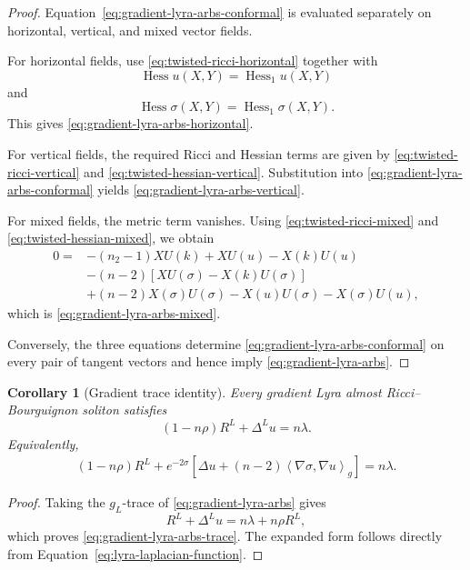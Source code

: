 \documentclass[a4paper,11pt]{article}
\theoremstyle{plain}
\newtheorem{corollary} {Corollary}[section]
\numberwithin{equation}{section}
\begin{document}
\begin{proof}
	Equation~\eqref{eq:gradient-lyra-arbs-conformal} is evaluated
	separately on horizontal, vertical, and mixed vector fields.
	
	For horizontal fields, use
	\eqref{eq:twisted-ricci-horizontal} together with
	\[
	\operatorname{Hess}u(X,Y)
	=
	\operatorname{Hess}_{1}u(X,Y)
	\]
	and
	\[
	\operatorname{Hess}\sigma(X,Y)
	=
	\operatorname{Hess}_{1}\sigma(X,Y).
	\]
	This gives \eqref{eq:gradient-lyra-arbs-horizontal}.
	
	For vertical fields, the required Ricci and Hessian terms are
	given by
	\eqref{eq:twisted-ricci-vertical} and
	\eqref{eq:twisted-hessian-vertical}. Substitution into
	\eqref{eq:gradient-lyra-arbs-conformal} yields
	\eqref{eq:gradient-lyra-arbs-vertical}.
	
	For mixed fields, the metric term vanishes. Using
	\eqref{eq:twisted-ricci-mixed} and
	\eqref{eq:twisted-hessian-mixed}, we obtain
	\begin{align*}
		0
		={}&
		-
		(n_{2}-1)XU(k)
		+
		XU(u)-X(k)U(u)
		\\
		&-
		(n-2)
		\left[
		XU(\sigma)-X(k)U(\sigma)
		\right]
		\\
		&+
		(n-2)X(\sigma)U(\sigma)
		-
		X(u)U(\sigma)
		-
		X(\sigma)U(u),
	\end{align*}
	which is \eqref{eq:gradient-lyra-arbs-mixed}.
	
	Conversely, the three equations determine
	\eqref{eq:gradient-lyra-arbs-conformal} on every pair of tangent
	vectors and hence imply
	\eqref{eq:gradient-lyra-arbs}.
\end{proof}

\begin{corollary}[Gradient trace identity]
	\label{cor:gradient-lyra-arbs-trace}
	Every gradient Lyra almost Ricci--Bourguignon soliton satisfies
	\begin{equation}
		(1-n\rho)R^{L}
		+
		\Delta^{L}u
		=
		n\lambda.
		\label{eq:gradient-lyra-arbs-trace}
	\end{equation}
	Equivalently,
	\begin{align}
		(1-n\rho)R^{L}
		+
		e^{-2\sigma}
		\left[
		\Delta u
		+
		(n-2)
		\left\langle
		\nabla\sigma,\nabla u
		\right\rangle_{g}
		\right]
		=
		n\lambda.
		\label{eq:gradient-lyra-arbs-trace-expanded}
	\end{align}
\end{corollary}

\begin{proof}
	Taking the \(g_{L}\)-trace of
	\eqref{eq:gradient-lyra-arbs} gives
	\[
	R^{L}
	+
	\Delta^{L}u
	=
	n\lambda+n\rho R^{L},
	\]
	which proves \eqref{eq:gradient-lyra-arbs-trace}. The expanded
	form follows directly from
	Equation~\eqref{eq:lyra-laplacian-function}.
\end{proof}
\end{document}

